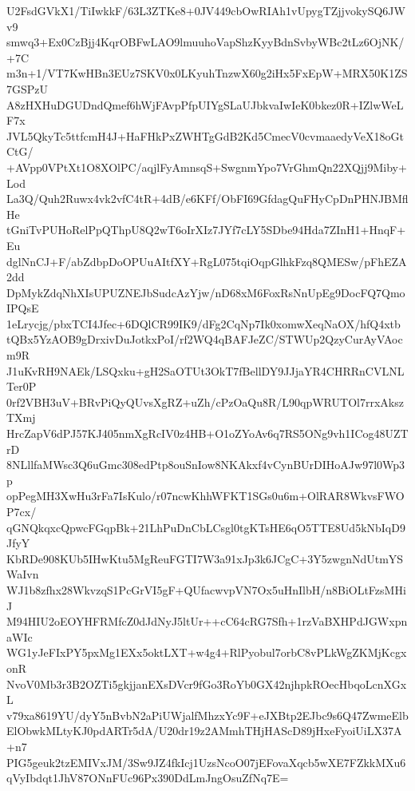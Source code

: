 U2FsdGVkX1/TiIwkkF/63L3ZTKe8+0JV449cbOwRIAh1vUpygTZjjvokySQ6JWv9
smwq3+Ex0CzBjj4KqrOBFwLAO9lmuuhoVapShzKyyBdnSvbyWBc2tLz6OjNK/+7C
m3n+1/VT7KwHBn3EUz7SKV0x0LKyuhTnzwX60g2iHx5FxEpW+MRX50K1ZS7GSPzU
A8zHXHuDGUDndQmef6hWjFAvpPfpUIYgSLaUJbkvaIwIeK0bkez0R+IZlwWeLF7x
JVL5QkyTc5ttfcmH4J+HaFHkPxZWHTgGdB2Kd5CmecV0cvmaaedyVeX18oGtCtG/
+AVpp0VPtXt1O8XOlPC/aqjlFyAmnsqS+SwgnmYpo7VrGhmQn22XQjj9Miby+Lod
La3Q/Quh2Ruwx4vk2vfC4tR+4dB/e6KFf/ObFI69GfdagQuFHyCpDnPHNJBMflHe
tGniTvPUHoRelPpQThpU8Q2wT6oIrXIz7JYf7cLY5SDbe94Hda7ZInH1+HnqF+Eu
dglNnCJ+F/abZdbpDoOPUuAItfXY+RgL075tqiOqpGlhkFzq8QMESw/pFhEZA2dd
DpMykZdqNhXIsUPUZNEJbSudcAzYjw/nD68xM6FoxRsNnUpEg9DocFQ7QmoIPQsE
1eLrycjg/pbxTCI4Jfec+6DQlCR99IK9/dFg2CqNp7Ik0xomwXeqNaOX/hfQ4xtb
tQBx5YzAOB9gDrxivDuJotkxPoI/rf2WQ4qBAFJeZC/STWUp2QzyCurAyVAocm9R
J1uKvRH9NAEk/LSQxku+gH2SaOTUt3OkT7fBellDY9JJjaYR4CHRRnCVLNLTer0P
0rf2VBH3uV+BRvPiQyQUvsXgRZ+uZh/cPzOaQu8R/L90qpWRUTOl7rrxAkszTXmj
HrcZapV6dPJ57KJ405nmXgRcIV0z4HB+O1oZYoAv6q7RS5ONg9vh1ICog48UZTrD
8NLllfaMWsc3Q6uGmc308edPtp8ouSnIow8NKAkxf4vCynBUrDIHoAJw97l0Wp3p
opPegMH3XwHu3rFa7IsKulo/r07ncwKhhWFKT1SGs0u6m+OlRAR8WkvsFWOP7cx/
qGNQkqxcQpwcFGqpBk+21LhPuDnCbLCsgl0tgKTsHE6qO5TTE8Ud5kNbIqD9JfyY
KbRDe908KUb5IHwKtu5MgReuFGTI7W3a91xJp3k6JCgC+3Y5zwgnNdUtmYSWaIvn
WJ1b8zfhx28WkvzqS1PcGrVI5gF+QUfacwvpVN7Ox5uHnIlbH/n8BiOLtFzsMHiJ
M94HIU2oEOYHFRMfcZ0dJdNyJ5ltUr++cC64cRG7Sfh+1rzVaBXHPdJGWxpnaWIc
WG1yJeFIxPY5pxMg1EXx5oktLXT+w4g4+RlPyobul7orbC8vPLkWgZKMjKcgxonR
NvoV0Mb3r3B2OZTi5gkjjanEXsDVcr9fGo3RoYb0GX42njhpkROecHbqoLcnXGxL
v79xa8619YU/dyY5nBvbN2aPiUWjalfMhzxYc9F+eJXBtp2EJbc9s6Q47ZwmeElb
ElObwkMLtyKJ0pdARTr5dA/U20dr19z2AMmhTHjHAScD89jHxeFyoiUiLX37A+n7
PIG5geuk2tzEMIVxJM/3Sw9JZ4fkIcj1UzsNcoO07jEFovaXqcb5wXE7FZkkMXu6
qVyIbdqt1JhV87ONnFUc96Px390DdLmJngOsuZfNq7E=
